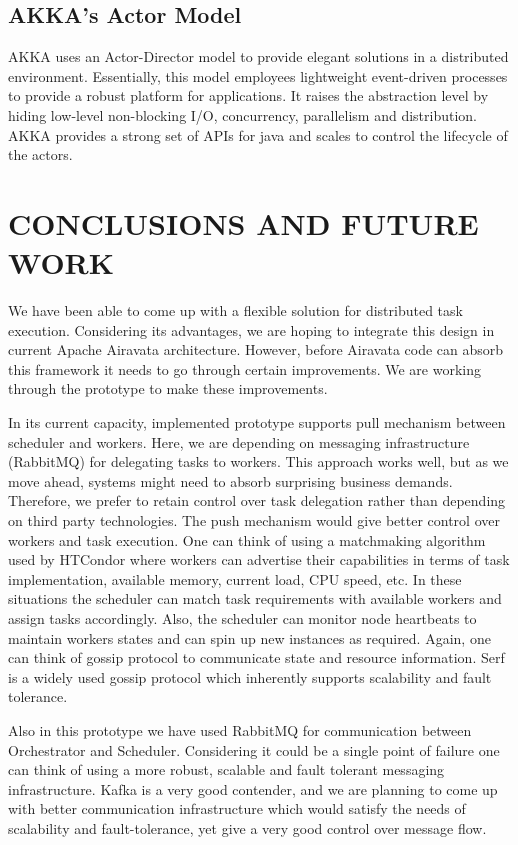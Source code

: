 \documentclass[sigconf]{acmart}
\begin{document}
\subsection{AKKA's Actor Model}
AKKA uses an Actor-Director model to provide elegant solutions in a distributed environment. Essentially, this model employees lightweight event-driven processes to provide a robust platform for applications. It raises the abstraction level by hiding low-level non-blocking I/O, concurrency, parallelism and distribution. AKKA provides a strong set of APIs for java and scales to control the lifecycle of the actors.

\section{CONCLUSIONS AND FUTURE WORK}
We have been able to come up with a flexible solution for distributed task execution. Considering its advantages, we are hoping to integrate this design in current Apache Airavata architecture. However, before Airavata code can absorb this framework it needs to go through certain improvements. We are working through the prototype to make these improvements. 

In its current capacity, implemented prototype supports pull mechanism between scheduler and workers. Here, we are depending on messaging infrastructure (RabbitMQ) for delegating tasks to workers. This approach works well, but as we move ahead, systems might need to absorb surprising business demands.  Therefore, we prefer to retain control over task delegation rather than depending on third party technologies. The push mechanism would give better control over workers and task execution. One can think of using a matchmaking algorithm used by HTCondor where workers can advertise their capabilities in terms of task implementation, available memory, current load, CPU speed, etc.  In these situations the scheduler can match task requirements with available workers and assign tasks accordingly. Also, the scheduler can monitor node heartbeats to maintain worker\textquotesingle s states and can spin up new instances as required. Again, one can think of gossip protocol to communicate state and resource information. Serf is a widely used gossip protocol which inherently supports scalability and fault tolerance. 

Also in this prototype we have used RabbitMQ for communication between Orchestrator and Scheduler. Considering it could be a single point of failure one can think of using a more robust, scalable and fault tolerant messaging infrastructure. Kafka is a very good contender, and we are planning to come up with better communication infrastructure which would satisfy the needs of scalability and fault-tolerance, yet give a very good control over message flow.   
\end{document}
